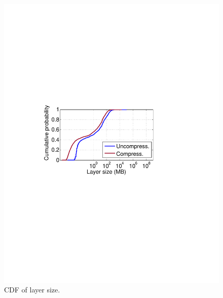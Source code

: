 \begin{figure}[t]
	\centering
	\begin{minipage}{0.22\textwidth}
		\centering
		\includegraphics[width=1\textwidth]{graphs/layer-size-cdf.pdf}
		\caption{CDF of layer size.}
		\label{fig:layer-size-cdf}
	\end{minipage}%
	\begin{minipage}{0.22\textwidth}
		\centering

\end{minipage}
\end{figure}
